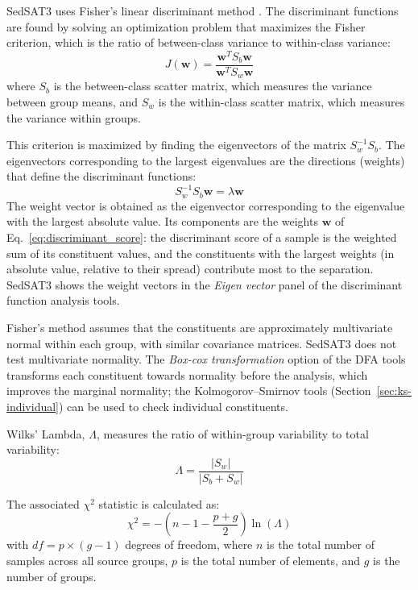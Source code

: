 \documentclass[12pt]{report}
\begin{document}
SedSAT3 uses Fisher's linear discriminant method \citep{fisher1936use}. The discriminant functions are found by solving an optimization problem that maximizes the Fisher criterion, which is the ratio of between-class variance to within-class variance:
\begin{equation}
    J(\mathbf{w}) = \frac{\mathbf{w}^T S_b \mathbf{w}}{\mathbf{w}^T S_w \mathbf{w}}
\end{equation}
where $S_b$ is the between-class scatter matrix, which measures the variance between group means, and $S_w$ is the within-class scatter matrix, which measures the variance within groups.

This criterion is maximized by finding the eigenvectors of the matrix $S_w^{-1} S_b$. The eigenvectors corresponding to the largest eigenvalues are the directions (weights) that define the discriminant functions:
\begin{equation}
    S_w^{-1} S_b \mathbf{w} = \lambda \mathbf{w}
\end{equation}
The weight vector is obtained as the eigenvector corresponding to the eigenvalue with the largest absolute value. Its components are the weights $\mathbf{w}$ of Eq.~\eqref{eq:discriminant_score}: the discriminant score of a sample is the weighted sum of its constituent values, and the constituents with the largest weights (in absolute value, relative to their spread) contribute most to the separation. SedSAT3 shows the weight vectors in the \textit{Eigen vector} panel of the discriminant function analysis tools.

Fisher's method assumes that the constituents are approximately multivariate normal within each group, with similar covariance matrices. SedSAT3 does not test multivariate normality. The \textit{Box-cox transformation} option of the DFA tools transforms each constituent towards normality before the analysis, which improves the marginal normality; the Kolmogorov--Smirnov tools (Section~\ref{sec:ks-individual}) can be used to check individual constituents.

Wilks' Lambda, $\Lambda$, measures the ratio of within-group variability to total variability:
\begin{equation}
    \Lambda = \frac{|S_w|}{|S_b + S_w|}
\end{equation}

The associated $\chi^2$ statistic is calculated as:
\begin{equation}
    \chi^2 = -\left(n - 1 - \frac{p + g}{2}\right) \ln(\Lambda)
\end{equation}
with $df = p \times (g - 1)$ degrees of freedom, where $n$ is the total number of samples across all source groups, $p$ is the total number of elements, and $g$ is the number of groups.
\end{document}
